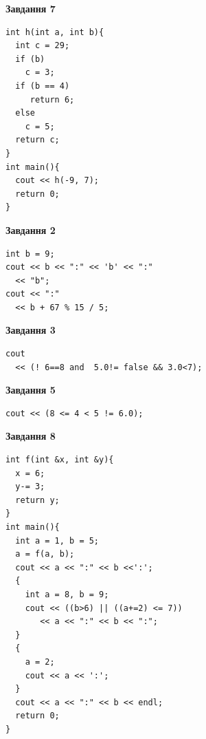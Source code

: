 \documentclass[12pt, ukrainian]{article}
\begin{document}
{\begin {large}
\begin{minipage}[t]{7.0cm}
\begin{center}
\textbf{Завдання 7}
\end{center}
\vspace{-8mm}

\begin{verbatim}
int h(int a, int b){
  int c = 29;
  if (b)
    c = 3;
  if (b == 4)
     return 6;
  else
    c = 5;
  return c;
}
int main(){
  cout << h(-9, 7);
  return 0;
}
\end{verbatim}

\end{minipage}
\vline \hspace{1mm}
\begin{minipage}[t]{11.0cm}

\begin{center}
\textbf{Завдання 2}
\end{center}
\vspace{-8mm}

\begin{verbatim}
int b = 9;
cout << b << ":" << 'b' << ":" 
  << "b";
cout << ":" 
  << b + 67 % 15 / 5;
\end{verbatim}



\begin{center}
\textbf{Завдання 3}
\end{center}
\vspace{-8mm}

\begin{verbatim}
cout 
  << (! 6==8 and  5.0!= false && 3.0<7);
\end{verbatim}



\begin{center}
\textbf{Завдання 5}
\end{center}
\vspace{-8mm}

\begin{verbatim}
cout << (8 <= 4 < 5 != 6.0);
\end{verbatim}



\begin{center}
\textbf{Завдання 8}
\end{center}
\vspace{-8mm}

\begin{verbatim}
int f(int &x, int &y){
  x = 6;
  y-= 3;
  return y;
}
int main(){
  int a = 1, b = 5;
  a = f(a, b);
  cout << a << ":" << b <<':';
  {
    int a = 8, b = 9;
    cout << ((b>6) || ((a+=2) <= 7))
       << a << ":" << b << ":";
  }
  {
    a = 2;
    cout << a << ':';
  }
  cout << a << ":" << b << endl;
  return 0;
}
\end{verbatim}


\end{minipage}
\end{large}}
\end{document}
